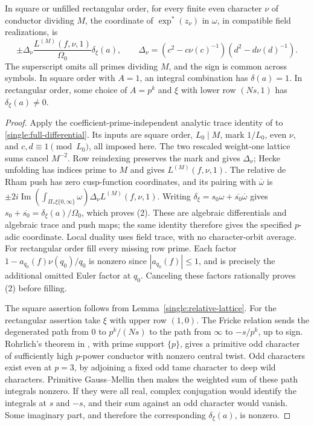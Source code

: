 \begin{proposition}\label{single:period-law}
In square or unfilled rectangular order, for every finite even
character \(\nu\) of conductor dividing \(M\), the coordinate of
\(\exp^*(z_\nu)\) in \(\omega\), in compatible field realizations, is
\begin{equation}\tag{2}\label{eq:source-2}
 \pm\Delta_\nu\frac{L^{(M)}(f,\nu,1)}{\Omega_0}\delta_\xi(a),\qquad
 \Delta_\nu=(c^2-c\nu(c)^{-1})(d^2-d\nu(d)^{-1}).
\end{equation}
The superscript omits all primes dividing \(M\), and the sign is
common across symbols.  In square order with \(A=1\), an integral
combination has \(\delta(a)=1\).  In rectangular order, some choice
of \(A=p^k\) and \(\xi\) with lower row \((Ns,1)\) has
\(\delta_\xi(a)\ne0\).
\end{proposition}
\begin{proof}
Apply the coefficient-prime-independent analytic trace identity of
\cite[Section~4, equation~(K5) and proof of ``The period formula'']{B}
to \eqref{single:full-differential}.  Its inputs are square order,
\(L_0\mid M\), mark \(1/L_0\), even \(\nu\), and
\(c,d\equiv1\pmod{L_0}\), all imposed here.  The two rescaled
weight-one lattice sums cancel \(M^{-2}\).  Row reindexing preserves
the mark and gives \(\Delta_\nu\); Hecke unfolding has indices prime
to \(M\) and gives \(L^{(M)}(f,\nu,1)\).
The relative de Rham push has zero cusp-function coordinates, and its
pairing with \(\overline\omega\) is
\(\pm2i\operatorname{Im}(\int_{\Pi_*\xi\{0,\infty\}}\omega)
\Delta_\nu L^{(M)}(f,\nu,1)\).  Writing
\(\delta_\xi=s_0\omega+\overline{s_0}\overline\omega\) gives
\(s_0+\overline{s_0}=\delta_\xi(a)/\Omega_0\), which proves (2).
These are algebraic differentials and algebraic trace and push maps;
the same identity therefore gives the specified \(p\)-adic coordinate.
Local duality uses field trace, with no character-orbit average.
For rectangular order fill every missing row prime.  Each factor
\(1-a_{q_0}(f)\nu(q_0)/q_0\) is nonzero since \(|a_{q_0}(f)|\leq1\),
and is precisely the additional omitted Euler factor at \(q_0\).
Canceling these factors rationally proves (2) before filling.

The square assertion follows from Lemma~\ref{single:relative-lattice}.
For the rectangular assertion take \(\xi\) with upper row \((1,0)\).
The Fricke relation sends the degenerated path from \(0\) to
\(p^k/(Ns)\) to the path from \(\infty\) to \(-s/p^k\), up to sign.
Rohrlich's theorem in \cite[Theorem~13.5(2)]{Kato}, with prime support
\(\{p\}\), gives a primitive odd character of sufficiently high
\(p\)-power conductor with nonzero central twist.  Odd characters
exist even at \(p=3\), by adjoining a fixed odd tame character to
deep wild characters.  Primitive Gauss--Mellin then makes the weighted
sum of these path integrals nonzero.  If they were all real, complex
conjugation would identify the integrals at \(s\) and \(-s\), and
their sum against an odd character would vanish.  Some imaginary part,
and therefore the corresponding \(\delta_\xi(a)\), is nonzero.
\end{proof}

